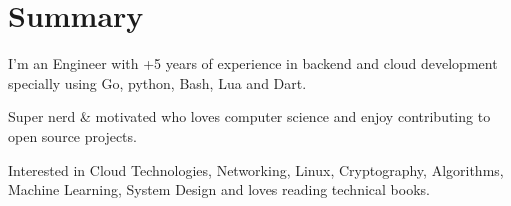 \section{Summary}\closesection{}

I'm an Engineer with +5 years of experience in backend and cloud development specially using Go, python, Bash, Lua and Dart.

Super nerd \& motivated who loves computer science and enjoy contributing to open source projects.

Interested in Cloud Technologies, Networking, Linux, Cryptography, Algorithms, Machine Learning, System Design and loves reading technical books.
